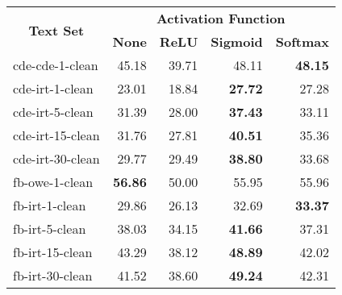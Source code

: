 \begin{tabular}{| l | r | r | r | r |}
    \hline

    \multicolumn{1}{|c|}{\multirow{2}{*}{\textbf{Text Set}}} &
    \multicolumn{4}{|c|}{\textbf{Activation Function}} \\

    &
    \multicolumn{1}{|c|}{\textbf{None}} &
    \multicolumn{1}{|c|}{\textbf{ReLU}} &
    \multicolumn{1}{|c|}{\textbf{Sigmoid}} &
    \multicolumn{1}{|c|}{\textbf{Softmax}} \\

    \hline \hline

    cde-cde-1-clean  & 45.18 & 39.71 & 48.11 & \textbf{48.15} \\
    cde-irt-1-clean  & 23.01 & 18.84 & \textbf{27.72} & 27.28 \\
    cde-irt-5-clean  & 31.39 & 28.00 & \textbf{37.43} & 33.11 \\
    cde-irt-15-clean & 31.76 & 27.81 & \textbf{40.51} & 35.36 \\
    cde-irt-30-clean & 29.77 & 29.49 & \textbf{38.80} & 33.68 \\ \hline
    fb-owe-1-clean   & \textbf{56.86} & 50.00 & 55.95 & 55.96 \\
    fb-irt-1-clean   & 29.86 & 26.13 & 32.69 & \textbf{33.37} \\
    fb-irt-5-clean   & 38.03 & 34.15 & \textbf{41.66} & 37.31 \\
    fb-irt-15-clean  & 43.29 & 38.12 & \textbf{48.89} & 42.02 \\
    fb-irt-30-clean  & 41.52 & 38.60 & \textbf{49.24} & 42.31 \\ \hline

\end{tabular}
